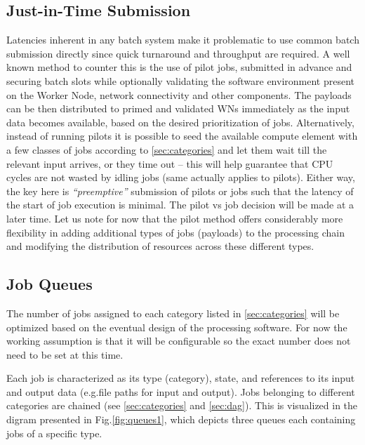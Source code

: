\documentclass[pdftex,12pt,letter]{article}
\begin{document}
\subsection{Just-in-Time Submission}
\label{sec:justintime}
Latencies inherent in any batch system make it problematic to use common batch submission directly
since quick turnaround and throughput are required. A well known method to counter this is the use
of pilot jobs, submitted in advance and securing batch slots while optionally validating the software
environment present on the Worker Node, network connectivity and other components. The
payloads can be then distributed to primed and validated WNs immediately as the input data becomes
available, based on the desired prioritization of jobs. Alternatively, instead of running pilots it is possible to
seed the available compute element with a few classes of jobs according to \ref{sec:categories} and
let them wait till the relevant input arrives, or they time out -- this will help guarantee that
CPU cycles are not wasted by idling jobs (same actually applies to pilots). Either way, the key
here is \textit{``preemptive''} submission of pilots or jobs such that the latency of the start of job
execution is minimal. The pilot vs job decision will be made at a later time. Let us note for now that
the pilot method offers considerably more flexibility in adding additional types of jobs (payloads)
to the processing chain and modifying the distribution of resources across these different types.

\subsection{Job Queues}
The number of jobs assigned to each category listed in \ref{sec:categories} will be optimized based
on the eventual design of the processing software. For now the working assumption is that it will
be configurable so the exact number does not need to be set at this time.

Each job is characterized as its type (category), state, and references to its input and output data
(e.g.file paths for input and output). Jobs belonging to different categories are chained (see \ref{sec:categories} and \ref{sec:dag}). This is
visualized in the digram presented in Fig.\ref{fig:queues1}, which depicts three queues each containing
jobs of a specific type.
\end{document}
